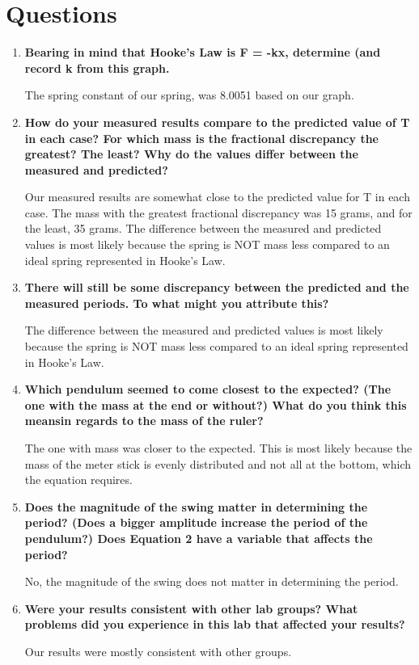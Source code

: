 
 \section{Questions}

\vspace{-0.5cm}
\singlespacing

\begin{enumerate}
	\item \textbf{Bearing in mind that Hooke's Law is F = -kx, determine (and record k from this graph.}

The spring constant of our spring, was 8.0051 based on our graph.	

	\item \textbf{How do your measured results compare to the predicted value of T in each case? For which mass is the fractional discrepancy the greatest? The least? Why do the values differ between the measured and predicted?}
 
	Our measured results are somewhat close to the predicted value for T in each case. The mass with the greatest fractional discrepancy was 15 grams, and for the least, 35 grams. The difference between the measured and predicted values is most likely because the spring is NOT mass less compared to an ideal spring represented in Hooke's Law.  

\item \textbf{There will still be some discrepancy between the predicted and the measured periods. To what might you attribute this?}

The difference between the measured and predicted values is most likely because the spring is NOT mass less compared to an ideal spring represented in Hooke's Law. 

\item \textbf{Which pendulum seemed to come closest to the expected? (The one with the mass at the end or without?) What do you think this meansin regards to the mass of the ruler?}

The one with mass was closer to the expected. This is most likely because the mass of the meter stick is evenly distributed and not all at the bottom, which the equation requires.

\item \textbf{Does the magnitude of the swing matter in determining the period? (Does a bigger amplitude increase the period of the pendulum?) Does Equation 2 have a variable that affects the period?}

No, the magnitude of the swing does not matter in determining the period.

\item \textbf{Were your results consistent with other lab groups? What problems did you experience in this lab that affected your results?}

	Our results were mostly consistent with other groups.

\end{enumerate}

\newpage
